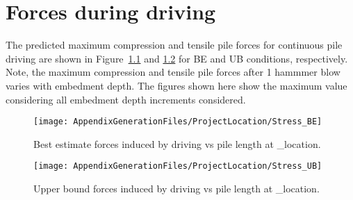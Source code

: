 \chapter{Forces during driving}\label{sec_1}
The predicted maximum compression and tensile pile forces for continuous
pile driving are shown in Figure~\ref{stress_BE} and \ref{stress_UB} for BE and UB conditions,
respectively. Note, the maximum compression and tensile pile forces after 1 hammmer blow varies with embedment depth. The figures shown here show the maximum value considering all embedment depth increments considered.




\begin{figure}[H]
\texttt{[image: AppendixGenerationFiles/ProjectLocation/Stress\_BE]}
\caption{Best estimate forces induced by driving vs pile length at {\ID_location}.}
\label{stress_BE}
\end{figure}
\vspace{-0.5cm}
\newpage
\begin{figure}[H]
\texttt{[image: AppendixGenerationFiles/ProjectLocation/Stress\_UB]}
\caption{Upper bound forces induced by driving vs pile length at {\ID_location}.}
\label{stress_UB}
\end{figure}

